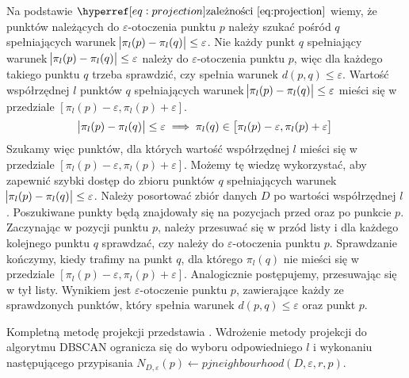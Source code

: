 Na podstawie $ \myhyperref{eq:projection}{zależności} $ wiemy, że punktów należących do $ \varepsilon $-otoczenia punktu $ p $ należy szukać pośród $ q $ spełniających warunek \mbox{$ \abs{\pi_l(p) - \pi_l(q)} \le \varepsilon $}. Nie każdy punkt $ q $ spełniający warunek $ \abs{\pi_l(p) - \pi_l(q)} \le \varepsilon $ należy do \linebreak$ \varepsilon $-otoczenia punktu $ p $, więc dla każdego takiego punktu $ q $ trzeba sprawdzić, czy spełnia warunek $ d(p,q) \le \varepsilon $. Wartość współrzędnej $ l $ punktów $ q $ spełniających warunek $ \abs{\pi_l(p) - \pi_l(q)} \le \varepsilon $ mieści się w przedziale $ \left[\pi_l(p)-\varepsilon,\pi_l(p)+\varepsilon\right] $.
\begin{equation}
	\abs{\pi_l(p) - \pi_l(q)} \le \varepsilon \implies \pi_l(q) \in \left[\pi_l(p)-\varepsilon,\pi_l(p)+\varepsilon\right]
\end{equation}
Szukamy więc punktów, dla których wartość współrzędnej $ l $ mieści się w przedziale $ \left[\pi_l(p)-\varepsilon,\pi_l(p)+\varepsilon\right] $. Możemy tę wiedzę wykorzystać, aby zapewnić szybki dostęp do zbioru punktów $ q $ spełniających warunek $ \abs{\pi_l(p) - \pi_l(q)} \le \varepsilon $. Należy posortować zbiór danych $ D $ po wartości współrzędnej $ l $. Poszukiwane punkty będą znajdowały się na pozycjach przed oraz po punkcie $ p $. Zaczynając w pozycji punktu $ p $, należy przesuwać się w przód listy i dla każdego kolejnego punktu $ q $ sprawdzać, czy należy do $ \varepsilon $-otoczenia punktu $ p $. Sprawdzanie kończymy, kiedy trafimy na punkt $ q $, dla którego $ \pi_l(q) $ nie mieści się w przedziale $ \left[\pi_l(p)-\varepsilon,\pi_l(p)+\varepsilon\right] $. Analogicznie postępujemy, przesuwając się w tył listy. Wynikiem jest $ \varepsilon $-otoczenie punktu $ p $, zawierające każdy ze sprawdzonych punktów, który spełnia warunek $ d(p,q) \le \varepsilon $ oraz punkt $ p $.

Kompletną metodę projekcji przedstawia . Wdrożenie metody projekcji do algorytmu DBSCAN ogranicza się do wyboru odpowiedniego $ l $ i wykonaniu następującego przypisania \mbox{$ N_{D,\varepsilon}(p) \gets pjneighbourhood(D, \varepsilon, r, p) $.}

